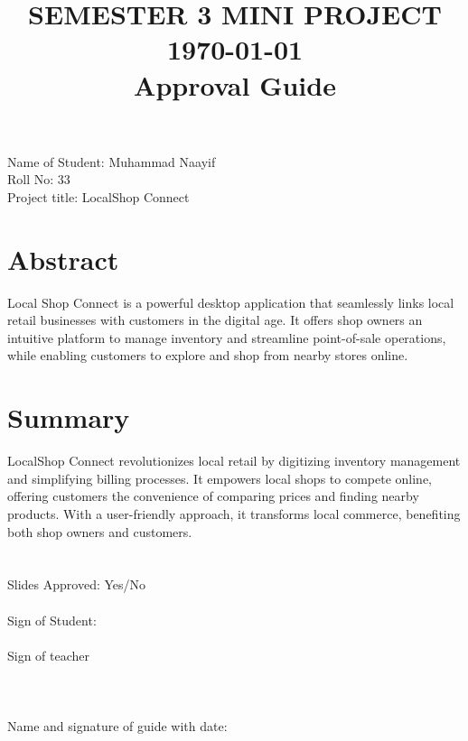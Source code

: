 \documentclass[a4paper]{article}
\title{SEMESTER 3 MINI PROJECT \today\\Approval Guide}
\author{}
\date{}
\begin{document}
\maketitle
\section*{}
Name of Student: Muhammad Naayif\\Roll No: 33\\Project title: LocalShop Connect

\section*{Abstract}
Local Shop Connect is a powerful desktop application that seamlessly links local retail businesses with customers in the digital age. It offers shop owners an intuitive platform to manage inventory and streamline point-of-sale operations, while enabling customers to explore and shop from nearby stores
online.

\section*{Summary}
LocalShop Connect revolutionizes local retail by digitizing inventory management and simplifying billing processes. It empowers local shops to compete online, offering customers the convenience of comparing prices and finding nearby products. With a user-friendly approach, it transforms local commerce, benefiting both shop owners and customers.

\section*{}

Slides Approved: Yes/No\\\\
Sign of Student:\\\\
Sign of teacher\\\\
\section*{}
Name and signature of guide with date: 
\end{document}
